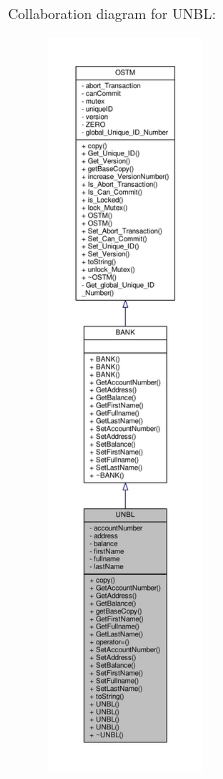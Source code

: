 Collaboration diagram for U\+N\+BL\+:
\nopagebreak
\begin{figure}[H]
\begin{center}
\leavevmode
\includegraphics[height=550pt]{class_u_n_b_l__coll__graph}
\end{center}
\end{figure}
